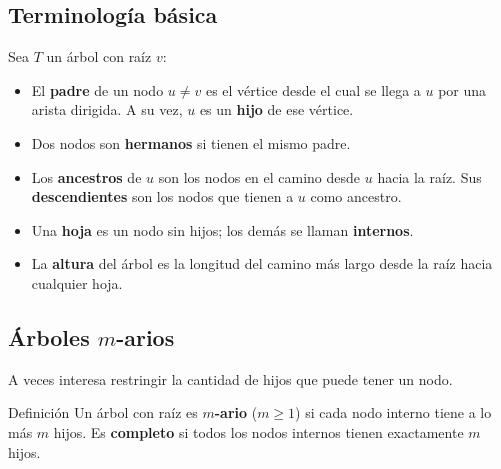 \begin{center}
\end{center}

\subsection*{Terminología básica}
Sea $T$ un árbol con raíz $v$:
\begin{itemize}
  \item El \textbf{padre} de un nodo $u \neq v$ es el vértice desde el cual se llega a $u$ por una arista dirigida. A su vez, $u$ es un \textbf{hijo} de ese vértice.
  \item Dos nodos son \textbf{hermanos} si tienen el mismo padre.
  \item Los \textbf{ancestros} de $u$ son los nodos en el camino desde $u$ hacia la raíz. Sus \textbf{descendientes} son los nodos que tienen a $u$ como ancestro.
  \item Una \textbf{hoja} es un nodo sin hijos; los demás se llaman \textbf{internos}.
  \item La \textbf{altura} del árbol es la longitud del camino más largo desde la raíz hacia cualquier hoja.
\end{itemize}

\subsection{Árboles $m$-arios}

A veces interesa restringir la cantidad de hijos que puede tener un nodo.

\begin{exampleblock}{Definición}
Un árbol con raíz es \textbf{$m$-ario} ($m \geq 1$) si cada nodo interno tiene a lo más $m$ hijos. Es \textbf{completo} si todos los nodos internos tienen exactamente $m$ hijos.
\end{exampleblock}

\begin{center}
\end{center}

